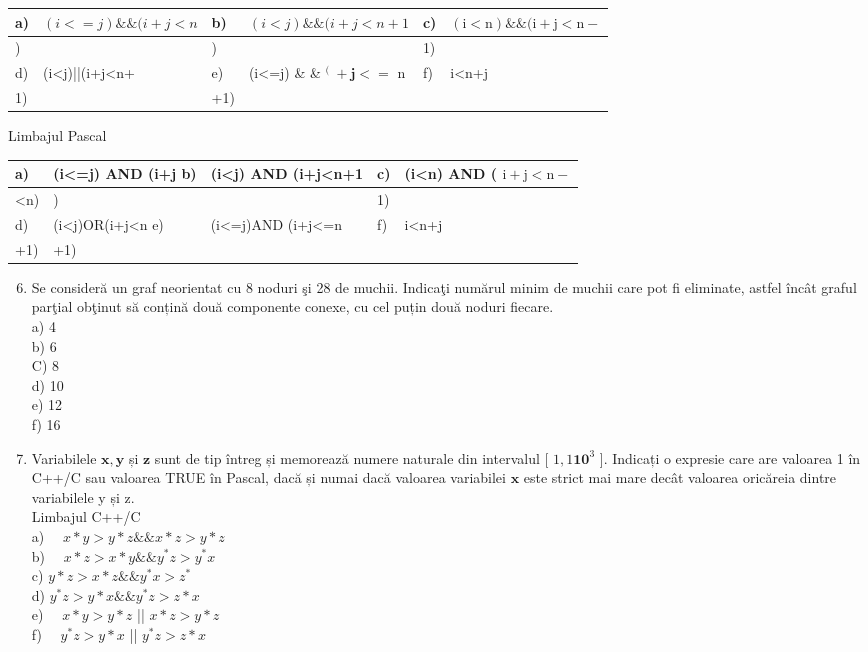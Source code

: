 \begin{center}
\begin{tabular}{|l|l|l|l|l|l|}
\hline
a) & $(i<=j) \& \&(i+j<n$ & b) & $(i<j) \& \&(i+j<n+1$ & c) & $(\mathrm{i}<\mathrm{n}) \& \&(\mathrm{i}+\mathrm{j}<\mathrm{n}-$ \\
\hline
) &  & ) &  & 1) &  \\
\hline
d) & (i<j)||(i+j<n+ & e) & (i<=j) \& \& ${ }^{\text {( }}+\mathbf{j}<=$ n & f) & i<n+j \\
\hline
1) &  & +1) &  &  &  \\
\hline
\end{tabular}
\end{center}

Limbajul Pascal

\begin{center}
\begin{tabular}{|l|l|l|l|l|}
\hline
a) & (i<=j) AND (i+j b) & (i<j) AND (i+j<n+1 & c) & (i<n) AND ( $\mathrm{i}+\mathrm{j}<\mathrm{n}-$ \\
\hline
<n) & ) &  & 1) &  \\
\hline
d) & (i<j)OR(i+j<n e) & (i<=j)AND (i+j<=n & f) & i<n+j \\
\hline
+1) & +1) &  &  &  \\
\hline
\end{tabular}
\end{center}

\begin{enumerate}
  \setcounter{enumi}{5}
  \item Se consideră un graf neorientat cu 8 noduri şi 28 de muchii. Indicaţi numărul minim de muchii care pot fi eliminate, astfel încât graful parţial obţinut să conțină două componente conexe, cu cel puțin două noduri fiecare.\\
a) 4\\
b) 6\\
C) 8\\
d) 10\\
e) 12\\
f) 16
  \item Variabilele $\mathbf{x}, \mathbf{y}$ și $\mathbf{z}$ sunt de tip întreg și memorează numere naturale din intervalul [ $1,1 \mathbf{1 0}^{3}$ ]. Indicați o expresie care are valoarea 1 în C++/C sau valoarea TRUE în Pascal, dacă și numai dacă valoarea variabilei $\mathbf{x}$ este strict mai mare decât valoarea oricăreia dintre variabilele y și z.\\
Limbajul C++/C\\
a) $\quad x * y>y * z \& \& x * z>y * z$\\
b) $\quad x * z>x * y \& \& y^{*} z>y^{*} x$\\
c) $y * z>x * z \& \& y^{*} x>z^{*}$\\
d) $y^{*} z>y * x \& \& y^{*} z>z * x$\\
e) $\quad x * y>y * z$ || $x * z>y * z$\\
f) $\quad y^{*} z>y * x$ || $y^{*} z>z * x$
\end{enumerate}

